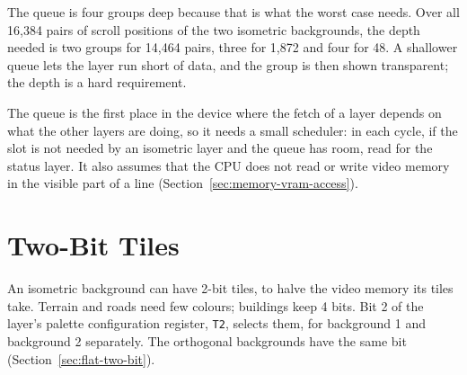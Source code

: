 The queue is four groups deep because that is what the worst case needs. Over all 16,384 pairs of scroll positions of
the two isometric backgrounds, the depth needed is two groups for 14,464 pairs, three for 1,872 and four for 48. A
shallower queue lets the layer run short of data, and the group is then shown transparent; the depth is a hard
requirement.

The queue is the first place in the device where the fetch of a layer depends on what the other layers are doing, so it
needs a small scheduler: in each cycle, if the slot is not needed by an isometric layer and the queue has room, read
for the status layer. It also assumes that the CPU does not read or write video memory in the visible part of a line
(Section~\ref{sec:memory-vram-access}).

\section{Two-Bit Tiles}
\label{sec:m2-two-bit}

An isometric background can have 2-bit tiles, to halve the video memory its tiles take. Terrain and roads need few
colours; buildings keep 4 bits. Bit 2 of the layer's palette configuration register, \texttt{T2}, selects them, for
background 1 and background 2 separately. The orthogonal backgrounds have the same bit
(Section~\ref{sec:flat-two-bit}).

